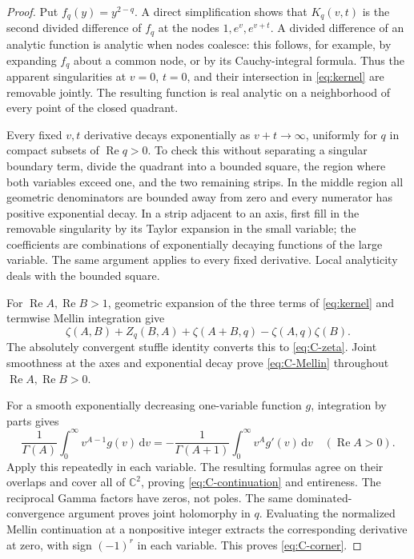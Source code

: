 \documentclass[11pt]{article}
\numberwithin{equation}{section}
\theoremstyle{definition}
\DeclareMathOperator{\Rea}{Re}
\newcommand{\C}{\mathbb C}
\newcommand{\dd}{\,\mathrm d}
\begin{document}
\begin{proof}
Put $f_q(y)=y^{2-q}$. A direct simplification shows that $K_q(v,t)$ is the second divided difference of $f_q$ at the nodes $1,e^v,e^{v+t}$. A divided difference of an analytic function is analytic when nodes coalesce: this follows, for example, by expanding $f_q$ about a common node, or by its Cauchy-integral formula. Thus the apparent singularities at $v=0$, $t=0$, and their intersection in \eqref{eq:kernel} are removable jointly. The resulting function is real analytic on a neighborhood of every point of the closed quadrant.

Every fixed $v,t$ derivative decays exponentially as $v+t\to\infty$, uniformly for $q$ in compact subsets of $\Rea q>0$. To check this without separating a singular boundary term, divide the quadrant into a bounded square, the region where both variables exceed one, and the two remaining strips. In the middle region all geometric denominators are bounded away from zero and every numerator has positive exponential decay. In a strip adjacent to an axis, first fill in the removable singularity by its Taylor expansion in the small variable; the coefficients are combinations of exponentially decaying functions of the large variable. The same argument applies to every fixed derivative. Local analyticity deals with the bounded square.

For $\Rea A,\Rea B>1$, geometric expansion of the three terms of \eqref{eq:kernel} and termwise Mellin integration give
\[
 \zeta(A,B)+Z_q(B,A)+\zeta(A+B,q)-\zeta(A,q)\zeta(B).
\]
The absolutely convergent stuffle identity converts this to \eqref{eq:C-zeta}. Joint smoothness at the axes and exponential decay prove \eqref{eq:C-Mellin} throughout $\Rea A,\Rea B>0$.

For a smooth exponentially decreasing one-variable function $g$, integration by parts gives
\[
 \frac1{\Gamma(A)}\int_0^\infty v^{A-1}g(v)\dd v
 =-\frac1{\Gamma(A+1)}\int_0^\infty v^A g'(v)\dd v
 \quad(\Rea A>0).
\]
Apply this repeatedly in each variable. The resulting formulas agree on their overlaps and cover all of $\C^2$, proving \eqref{eq:C-continuation} and entireness. The reciprocal Gamma factors have zeros, not poles. The same dominated-convergence argument proves joint holomorphy in $q$. Evaluating the normalized Mellin continuation at a nonpositive integer extracts the corresponding derivative at zero, with sign $(-1)^r$ in each variable. This proves \eqref{eq:C-corner}.
\end{proof}
\end{document}
